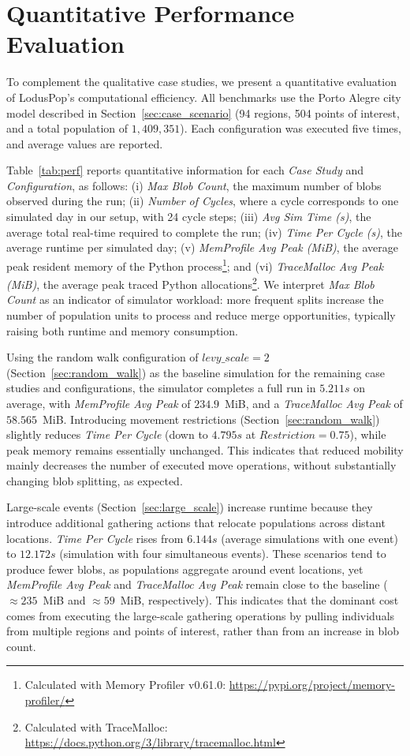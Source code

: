 \section{Quantitative Performance Evaluation}
\label{sec:quant_perf}

To complement the qualitative case studies, we present a quantitative evaluation of LodusPop’s computational efficiency. All benchmarks use the Porto Alegre city model described in Section~\ref{sec:case_scenario} (94 regions, 504 points of interest, and a total population of $1,409,351$). Each configuration was executed five times, and average values are reported.

Table~\ref{tab:perf} reports quantitative information for each \textit{Case Study} and \textit{Configuration}, as follows: (i) \textit{Max Blob Count}, the maximum number of blobs observed during the run; (ii) \textit{Number of Cycles}, where a cycle corresponds to one simulated day in our setup, with 24 cycle steps; (iii) \textit{Avg Sim Time (s)}, the average total real-time required to complete the run; (iv) \textit{Time Per Cycle (s)}, the average runtime per simulated day; (v) \textit{MemProfile Avg Peak (MiB)}, the average peak resident memory of the Python process\footnote{Calculated with Memory Profiler v0.61.0: \url{https://pypi.org/project/memory-profiler/}}; and (vi) \textit{TraceMalloc Avg Peak (MiB)}, the average peak traced Python allocations\footnote{Calculated with TraceMalloc: \url{https://docs.python.org/3/library/tracemalloc.html}}. We interpret \textit{Max Blob Count} as an indicator of simulator workload: more frequent splits increase the number of population units to process and reduce merge opportunities, typically raising both runtime and memory consumption.

Using the random walk configuration of $levy\_scale=2$ (Section~\ref{sec:random_walk}) as the baseline simulation for the remaining case studies and configurations, the simulator completes a full run in $5.211s$ on average, with \emph{MemProfile Avg Peak} of $234.9$~MiB, and a \textit{TraceMalloc Avg Peak} of $58.565$~MiB. Introducing movement restrictions (Section~\ref{sec:random_walk}) slightly reduces \textit{Time Per Cycle} (down to $4.795s$ at $Restriction =0.75$), while peak memory remains essentially unchanged. This indicates that reduced mobility mainly decreases the number of executed move operations, without substantially changing blob splitting, as expected.

Large-scale events (Section~\ref{sec:large_scale}) increase runtime because they introduce additional gathering actions that relocate populations across distant locations. \textit{Time Per Cycle} rises from $6.144s$ (average simulations with one event) to $12.172s$ (simulation with four simultaneous events). These scenarios tend to produce fewer blobs, as populations aggregate around event locations, yet \textit{MemProfile Avg Peak} and \textit{TraceMalloc Avg Peak} remain close to the baseline ($\approx 235$~MiB and $\approx 59$~MiB, respectively). This indicates that the dominant cost comes from executing the large-scale gathering operations by pulling individuals from multiple regions and points of interest, rather than from an increase in blob count.

